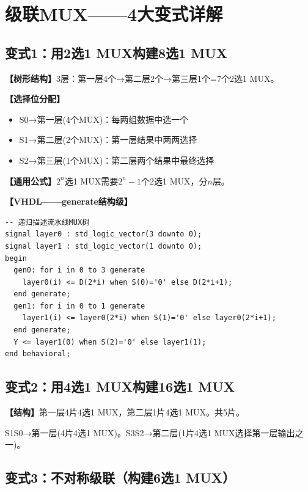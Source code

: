 \chapter{级联MUX——4大变式详解}

\section{变式1：用2选1 MUX构建8选1 MUX}

\begin{detailbox}[完整教学]
\textbf{【树形结构】}3层：第一层4个→第二层2个→第三层1个=7个2选1 MUX。

\textbf{【选择位分配】}
\begin{itemize}
  \item S0→第一层(4个MUX)：每两组数据中选一个
  \item S1→第二层(2个MUX)：第一层结果中两两选择
  \item S2→第三层(1个MUX)：第二层两个结果中最终选择
\end{itemize}

\textbf{【通用公式】}$2^n$选1 MUX需要$2^n-1$个2选1 MUX，分$n$层。

\textbf{【VHDL——generate结构级】}
\begin{lstlisting}
-- 递归描述流水线MUX树
signal layer0 : std_logic_vector(3 downto 0);
signal layer1 : std_logic_vector(1 downto 0);
begin
  gen0: for i in 0 to 3 generate
    layer0(i) <= D(2*i) when S(0)='0' else D(2*i+1);
  end generate;
  gen1: for i in 0 to 1 generate
    layer1(i) <= layer0(2*i) when S(1)='0' else layer0(2*i+1);
  end generate;
  Y <= layer1(0) when S(2)='0' else layer1(1);
end behavioral;
\end{lstlisting}
\end{detailbox}


\section{变式2：用4选1 MUX构建16选1 MUX}

\begin{detailbox}[完整教学]
\textbf{【结构】}第一层4片4选1 MUX，第二层1片4选1 MUX。共5片。

S1S0→第一层(4片4选1 MUX)。S3S2→第二层(1片4选1 MUX选择第一层输出之一)。
\end{detailbox}


\section{变式3：不对称级联（构建6选1 MUX）}


